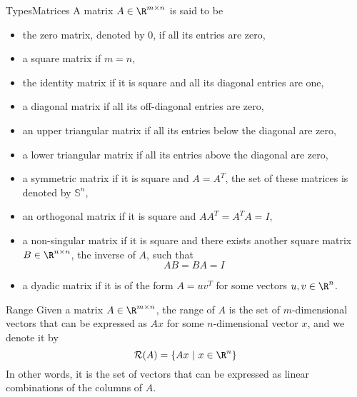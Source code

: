 \begin{ex}{TypesMatrices}
    A matrix $A \in \R^{m \times n}$ is said to be
    \begin{itemize}
        \item 
            the zero matrix, denoted by $0$, if all its entries are zero,
        \item 
            a square matrix if $m = n$,
        \item 
            the identity matrix if it is square and all its diagonal entries are one,
        \item 
            a diagonal matrix if all its off-diagonal entries are zero,
        \item 
            an upper triangular matrix if all its entries below the diagonal are zero,
        \item 
            a lower triangular matrix if all its entries above the diagonal are zero,
        \item
            a symmetric matrix if it is square and $A = A^T$, the set of these matrices is denoted by $\mathbb{S}^n$,
        \item 
            an orthogonal matrix if it is square and $AA^T = A^T A = I$,
        \item 
            a non-singular matrix if it is square and there exists another square matrix $B \in \R^{n \times n}$, the inverse of $A$, such that 
            \begin{equation*}
                AB = BA = I
            \end{equation*} 
        \item 
            a dyadic matrix if it is of the form $A = uv^T$ for some vectors $u, v \in \R^n$.
    \end{itemize}
\end{ex}

\begin{theo}[Range]{Range}
    Given a matrix $A \in \R^{m \times n}$, the range of $A$ is the set of $m$-dimensional vectors that can be expressed as $Ax$ for some $n$-dimensional vector $x$, and we denote it by 
    \begin{equation*}
        \mathcal{R}(A) = \{ Ax \ | \ x \in \R^n \}
    \end{equation*}
    In other words, it is the set of vectors that can be expressed as linear combinations of the columns of $A$.
\end{theo}

